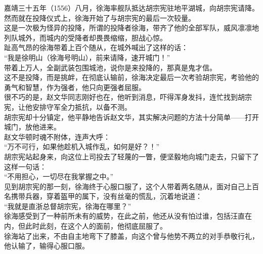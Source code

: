 \begin{multicols}{\theparacolNo}
嘉靖三十五年（1556）八月，徐海率舰队抵达胡宗宪驻地平湖城，向胡宗宪请降。\\

然而就在投降仪式上，徐海开始了与胡宗宪的最后一次较量。\\

这是一次极为怪异的投降，所谓的投降者徐海，带齐了他的全部军队，威风凛凛地列队城外，而城内的受降者却畏畏缩缩，胆战心惊。\\

趾高气昂的徐海带着上百个随从，在城外喊出了这样的话：\\

“我是徐明山（徐海号明山），前来请降，速开城门！”\\

带着上万人，全副武装包围城池，说你是来投降的，那真是鬼才信。\\

这不是投降，而是挑衅，在彻底认输前，徐海决定最后一次考验胡宗宪，考验他的勇气和智慧，作为强者，他只向更强者屈服。\\

很不巧的是，赵文华同志刚好也在，他听到消息，吓得浑身发抖，连忙找到胡宗宪，让他安排守军全力抵抗，以备不测。\\

胡宗宪却十分镇定，他平静地告诉赵文华，其实解决问题的方法十分简单——打开城门，放他进来。\\

赵文华顿时魂不附体，连声大呼：\\

“万不可行，如果他趁机入城作乱，如何是好？！”\\

胡宗宪站起身来，向这位上司投去了轻蔑的一瞥，便坚毅地向城门走去，只留下了这样一句话：\\

“不用担心，一切尽在我掌握之中。”\\

见到胡宗宪的那一刻，徐海终于心服口服了，这个人带着两名随从，面对自己上百名携带兵器，穿着盔甲的属下，没有丝毫的慌乱，沉着地说道：\\

“我就是直浙总督胡宗宪，徐海在哪里？”\\

徐海感受到了一种前所未有的威势，在此之前，他还从没有怕过谁，包括汪直在内，但此时此刻，在这个人的面前，他彻底屈服了。\\

徐海站了出来，不由自主地弯下了膝盖，向这个曾与他势不两立的对手恭敬行礼，他认输了，输得心服口服。\\


\end{multicols}
